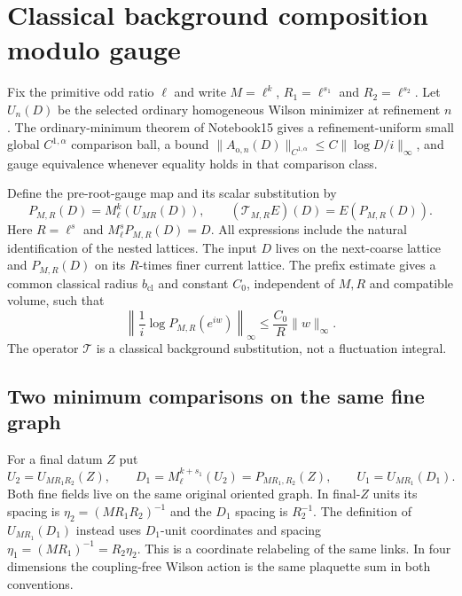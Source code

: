 \section{Classical background composition modulo gauge}
\label{csg-section}

Fix the primitive odd ratio $\ell$ and write
$M=\ell^k$, $R_1=\ell^{s_1}$ and $R_2=\ell^{s_2}$.
Let $U_n(D)$ be the selected ordinary homogeneous Wilson
minimizer at refinement $n$. The ordinary-minimum theorem
of Notebook15 gives a refinement-uniform small global
$C^{1,\alpha}$ comparison ball, a bound
$\|A_{\mathrm o,n}(D)\|_{C^{1,\alpha}}
\le C\|\log D/i\|_\infty$, and gauge equivalence whenever
equality holds in that comparison class.

Define the pre-root-gauge map and its scalar substitution by
\begin{equation}
 P_{M,R}(D)=M_\ell^k(U_{MR}(D)),\qquad
 (\mathcal T_{M,R}E)(D)=E(P_{M,R}(D)).
 \label{csg-maps}
\end{equation}
Here $R=\ell^s$ and $M_\ell^sP_{M,R}(D)=D$.
All expressions include the natural identification of the
nested lattices. The input $D$ lives on the next-coarse
lattice and $P_{M,R}(D)$ on its $R$-times finer current
lattice. The prefix estimate gives a common classical
radius $b_{\mathrm{cl}}$ and constant $C_0$, independent of
$M,R$ and compatible volume, such that
\begin{equation}
 \left\|\frac1i\log P_{M,R}(e^{iw})\right\|_\infty
                \le\frac{C_0}{R}\|w\|_\infty.
 \label{csg-amplitude}
\end{equation}
The operator $\mathcal T$ is a classical background
substitution, not a fluctuation integral.

\subsection{Two minimum comparisons on the same fine graph}
\label{csg-comparison-section}

For a final datum $Z$ put
\begin{equation}
 U_2=U_{MR_1R_2}(Z),\qquad
 D_1=M_\ell^{k+s_1}(U_2)=P_{MR_1,R_2}(Z),\qquad
 U_1=U_{MR_1}(D_1).
 \label{csg-fields}
\end{equation}
Both fine fields live on the same original oriented graph.
In final-$Z$ units its spacing is
$\eta_2=(MR_1R_2)^{-1}$ and the $D_1$ spacing is $R_2^{-1}$.
The definition of $U_{MR_1}(D_1)$ instead uses $D_1$-unit
coordinates and spacing $\eta_1=(MR_1)^{-1}=R_2\eta_2$.
This is a coordinate relabeling of the same links. In four
dimensions the coupling-free Wilson action is the same
plaquette sum in both conventions.

